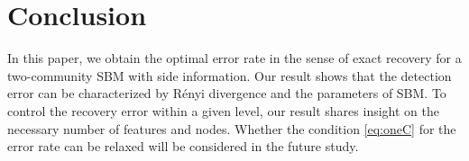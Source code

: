 \documentclass[conference,letterpaper]{IEEEtran}
\begin{document}
\section{Conclusion}\label{s:conclusion}
In this paper, we obtain the optimal error rate in the sense of exact recovery for a two-community SBM with side information. Our result
shows that the detection error can be characterized by Rényi divergence and the parameters of SBM. To control the recovery error within a given level,
our result shares insight on
the necessary number of features and nodes.
Whether the condition \eqref{eq:oneC} for the error rate can be relaxed
will be considered in the future study.


\end{document}
